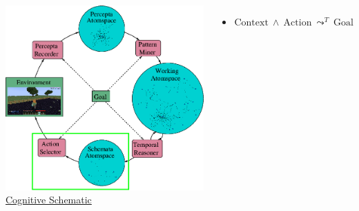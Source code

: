 \documentclass[aspectratio=169]{beamer}
\newcommand{\lpreimp}[1]{\leadsto^{#1}}
\begin{document}
\begin{frame}

  \begin{columns}
    \column{3.2in}
    \includegraphics[scale=0.3]{pictures/rocca-chart-action-highlight-v0.7.png}
    \column{2.5in}
    \underline{Cognitive Schematic}
    \begin{itemize}
    \item $\text{Context}\ \land\ \text{Action}\ \lpreimp{T}\ \text{Goal}$
    \end{itemize}
  \end{columns}

\end{frame}
\end{document}
